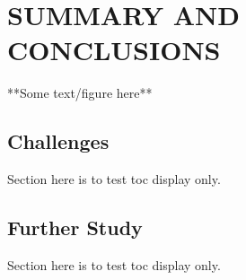 %
%
%



\chapter{SUMMARY AND CONCLUSIONS}\label{cha:Summary}

**Some text/figure here**

\section{Challenges}
Section here is to test toc display only.

\section{Further Study}
Section here is to test toc display only.

